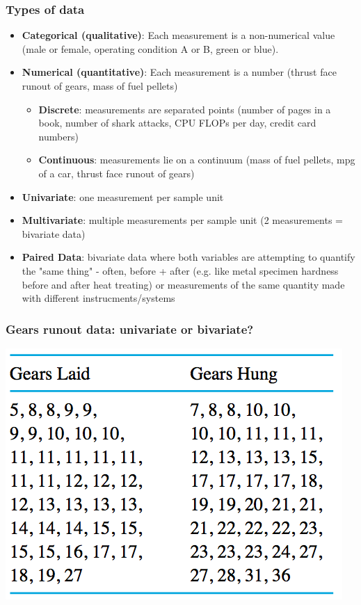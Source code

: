 \documentclass[handout]{beamer}
\numberwithin{equation}{section}
\begin{document}
\begin{frame}
\frametitle{Types of data}
\vspace{-0.5em}
{\small
\begin{itemize}
\item {\bf Categorical (qualitative)}: Each measurement is a non-numerical value (male or female, operating condition A or B, green or blue).
\pause \item {\bf Numerical (quantitative)}: Each measurement is a number (thrust face runout of gears, mass of fuel pellets)
\begin{itemize}
\pause \item {\bf Discrete}: measurements are separated points (number of pages in a book, number of shark attacks, CPU FLOPs per day, credit card numbers)
\pause \item {\bf Continuous}: measurements lie on a continuum (mass of fuel pellets, mpg of a car, thrust face runout of gears)
\end{itemize}
\pause \item {\bf Univariate}: one measurement per sample unit
\pause \item {\bf Multivariate}: multiple measurements per sample unit (2 measurements = bivariate data)
\pause \item {\bf Paired Data}: bivariate data where both variables are attempting to quantify the "same thing" - often, before + after (e.g. like metal specimen hardness before and after heat treating) or measurements of the same quantity made with different instrucments/systems
\end{itemize}
}
\end{frame}


\begin{frame}
\frametitle{Gears runout data: univariate or bivariate?}

\begin{center}
 \includegraphics{../../fig/gearstable.png} 
\end{center}

\end{frame}
\end{document}
